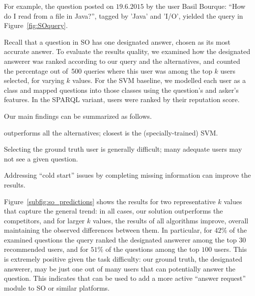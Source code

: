 For example, the question
posted on $19.6.2015$ by the user Basil Bourque: ``How do I read from a file in Java?'', tagged
by 'Java' and 'I/O', yielded the \qlang{} query in Figure~\ref{fig:SOquery}.




Recall that a question in SO has one designated
answer, chosen as its most accurate answer. To evaluate the results quality, we examined how the designated answerer was ranked according to our query and the alternatives, and counted the
percentage out of~500 queries where this user was among the top $k$ users selected, for varying $k$ values. For the SVM baseline, we modelled
each user as a class and mapped  questions into those classes using the question's and asker's
features. In the SPARQL variant, 
users were ranked by their reputation score.



Our main findings can be summarized as follows.
\begin{compactitem}
\item \qlang{} outperforms all the alternatives; closest is the (specially-trained) SVM.
\item Selecting the ground truth user is generally difficult; many adequate users may not see a given question.
\item Addressing ``cold start'' issues by completing missing information can improve the results.
\end{compactitem}
Figure~\ref{subfig:so_predictions} shows the results for two representative $k$ values that capture the general trend: in all cases, our solution outperforms the
competitors, and for larger $k$ values, the results of all algorithms improve, overall maintaining the observed differences between them. In particular, for $42\%$ of the
examined questions the \qlang{} query ranked the designated
answerer among the top $30$ recommended users, and for $51\%$ of the
questions among the top $100$ users.
This is
extremely positive given the task difficulty: our ground truth, the designated answerer, may be just one out of many users that can potentially answer the question.
This indicates that \qlang{} can
be used to add a more active ``answer request'' module to  SO or similar platforms.

